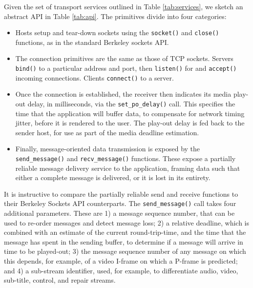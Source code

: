 \documentclass[10pt]{sig-alternate-05-2015}
\begin{document}
Given the set of transport services outlined in Table \ref{tab:services},
we sketch an abstract API in  Table \ref{tab:api}. The primitives divide
into four categories:

\begin{itemize}
  \item Hosts setup and tear-down sockets using the \texttt{socket()}
    and \texttt{close()} functions, as in the standard Berkeley sockets
    API.

  \item The connection primitives are the same as those of TCP sockets.
    Servers \texttt{bind()} to a particular address and port, then
    \texttt{listen()} for and \texttt{accept()} incoming connections.
    Clients \texttt{connect()} to a server.

   \item Once the connection is established, the receiver
     then indicates its media play-out delay, in milliseconds, via
     the \texttt{set\_po\_delay()} call. This specifies the time that the
     application will buffer data, to compensate for network timing jitter,
     before it is rendered to the user. The play-out delay is fed back to
     the sender host, for use as part of the media deadline estimation.

  \item Finally, message-oriented data transmission is exposed by the
    \texttt{send\_message()} and \texttt{recv\_message()} functions.
    These expose a partially reliable message delivery service to the
    application, framing data such that either a complete message is
    delivered, or it is lost in its entirety.

\end{itemize}

    It is instructive to compare the partially reliable send and receive
    functions to their Berkeley Sockets API counterparts. The
    \texttt{send\_message()} call takes four additional parameters. These are 1)
    a message sequence number, that can be used to re-order messages and detect
    message loss; 2) a relative deadline, which is combined with an estimate of
    the current round-trip-time, and the time that the message has spent in the
    sending buffer, to determine if a message will arrive in time to be
    played-out; 3) the message sequence number of any message on which this
    depends, for example, of a video I-frame on which a P-frame is predicted;
    and 4) a sub-stream identifier, used, for example, to differentiate audio,
    video, sub-title, control, and repair streams.
\end{document}
